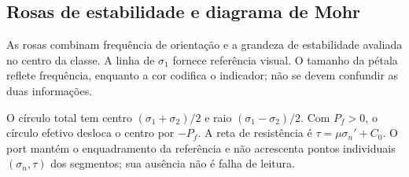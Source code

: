 \subsection{Rosas de estabilidade e diagrama de Mohr}
As rosas combinam frequência de orientação e a grandeza de estabilidade avaliada no centro da classe. A linha de \(\sigma_1\) fornece referência visual. O tamanho da pétala reflete frequência, enquanto a cor codifica o indicador; não se devem confundir as duas informações.

O círculo total tem centro \((\sigma_1+\sigma_2)/2\) e raio \((\sigma_1-\sigma_2)/2\). Com \(P_f>0\), o círculo efetivo desloca o centro por \(-P_f\). A reta de resistência é \(\tau=\mu\sigma_n'+C_0\). O port mantém o enquadramento da referência e não acrescenta pontos individuais \((\sigma_n,\tau)\) dos segmentos; sua ausência não é falha de leitura.
